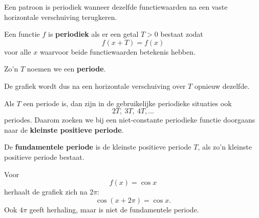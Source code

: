 \documentclass{ximera}
\begin{document}

Een patroon is periodiek wanneer dezelfde functiewaarden na een vaste
horizontale verschuiving terugkeren.

\begin{center}
\end{center}

\begin{definitie}
Een functie \(f\) is \textbf{periodiek} als er een getal \(T>0\) bestaat zodat
\[
f(x+T)=f(x)
\]
voor alle \(x\) waarvoor beide functiewaarden betekenis hebben.

Zo'n \(T\) noemen we een \textbf{periode}.
\end{definitie}

De grafiek wordt dus na een horizontale verschuiving over \(T\) opnieuw dezelfde.


Als \(T\) een periode is, dan zijn in de gebruikelijke periodieke situaties ook
\[
2T,\ 3T,\ 4T,\ldots
\]
periodes. Daarom zoeken we bij een niet-constante periodieke functie doorgaans
naar de \textbf{kleinste positieve periode}.

\begin{definitie}
De \textbf{fundamentele periode} is de kleinste positieve periode \(T\),
als zo'n kleinste positieve periode bestaat.
\end{definitie}

\begin{voorbeeld}
Voor
\[
f(x)=\cos x
\]
herhaalt de grafiek zich na \(2\pi\):
\[
\cos(x+2\pi)=\cos x.
\]
Ook \(4\pi\) geeft herhaling, maar is niet de fundamentele periode.
\end{voorbeeld}



\end{document}
